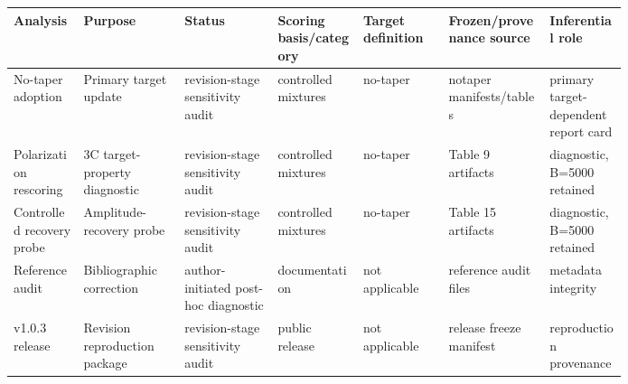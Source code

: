\par\medskip
\pagebreak[2]
\begin{tabular}{@{}p{0.09\linewidth}p{0.13\linewidth}p{0.12\linewidth}p{0.11\linewidth}p{0.11\linewidth}p{0.13\linewidth}p{0.10\linewidth}@{}}
\toprule
Analysis & Purpose & Status & Scoring basis/category & Target definition & Frozen/provenance source & Inferential role \\
\midrule
No-taper adoption & Primary target update & revision-stage sensitivity audit & controlled mixtures & no-taper & notaper manifests/tables & primary target-dependent report card \\
Polarization rescoring & 3C target-property diagnostic & revision-stage sensitivity audit & controlled mixtures & no-taper & Table 9 artifacts & diagnostic, B=5000 retained \\
Controlled recovery probe & Amplitude-recovery probe & revision-stage sensitivity audit & controlled mixtures & no-taper & Table 15 artifacts & diagnostic, B=5000 retained \\
Reference audit & Bibliographic correction & author-initiated post-hoc diagnostic & documentation & not applicable & reference audit files & metadata integrity \\
v1.0.3 release & Revision reproduction package & revision-stage sensitivity audit & public release & not applicable & release freeze manifest & reproduction provenance \\
\bottomrule
\end{tabular}
